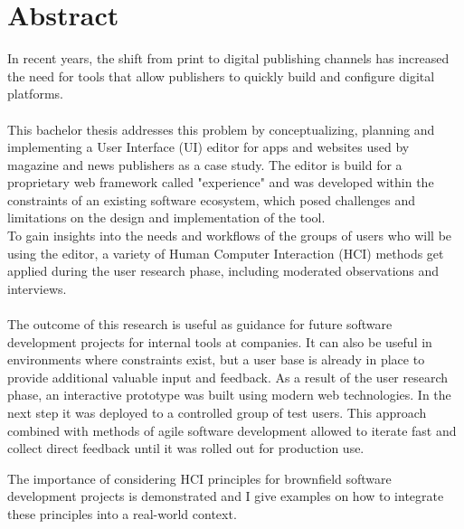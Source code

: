 %

\chapter*{Abstract}
In recent years, the shift from print to digital publishing channels has increased the need for tools that allow publishers to quickly build and configure digital platforms.
\\\\
This bachelor thesis addresses this problem by conceptualizing, planning and implementing a User Interface (UI) editor for apps and websites used by magazine and news publishers as a case study.
The editor is build for a proprietary web framework called "\Gls{experience}" and was developed within the constraints of an existing software ecosystem, which posed challenges and limitations on the design and implementation of the tool.
\\
To gain insights into the needs and workflows of the groups of users who will be using the editor, a variety of Human Computer Interaction (HCI) methods get applied during the user research phase, including moderated observations and interviews. 
\\\\
The outcome of this research is useful as guidance for future software development projects for internal tools at companies. It can also be useful in environments where constraints exist, but a user base is already in place to provide additional valuable input and feedback.
As a result of the user research phase, an interactive prototype was built using modern web technologies.
In the next step it was deployed to a controlled group of test users.
This approach combined with methods of agile software development allowed to iterate fast and collect direct feedback until it was rolled out for production use.

The importance of considering HCI principles for brownfield software development projects is demonstrated and I give examples on how to integrate these principles into a real-world context.